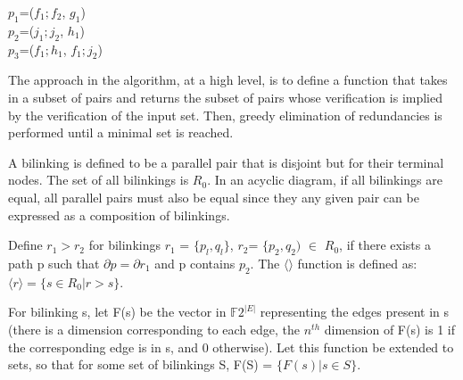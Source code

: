 \documentclass[sigplan,review,anonymous]{acmart}
\begin{document}
\begin{center}

$p_1$=($f_1;f_2$, $g_1$)\\
$p_2$=($j_1;j_2$, $h_1$)\\
$p_3$=($f_1;h_1$, $f_1;j_2$)
\end{center}


The approach in the algorithm, at a high level, is to define a function that takes in a subset of pairs and returns the subset of pairs whose verification is implied by the verification of the input set. Then, greedy elimination of redundancies is performed until a minimal set is reached.

A bilinking is defined to be a parallel pair that is disjoint but for their terminal nodes. The set of all bilinkings is $R_0$.
In an acyclic diagram, if all bilinkings are equal, all parallel pairs must also be equal since they any given pair can be expressed as a composition of bilinkings.

Define $r_1>r_2$ for bilinkings $r_1$ = $\{p_l,q_l\}$, $r_2$= $\{p_2, q_2)$ $\in$ $R_0$, if there exists a path p such that $\partial p=\partial r_1$ and p contains $p_2$.
The $\langle\rangle$ function is defined as:
$\langle r \rangle = \{ s\in R_0| r>s\}$.

For bilinking s, let F(s) be the vector in $\mathbb{F}2^{|E|}$ representing the edges present in s (there is a dimension corresponding to each edge, the $n^{th}$ dimension of F(s) is 1 if the corresponding edge is in s, and 0 otherwise). Let this function be extended to sets, so that for some set of bilinkings S, F(S) = $\{ F(s) | s\in S \}$.
\end{document}
